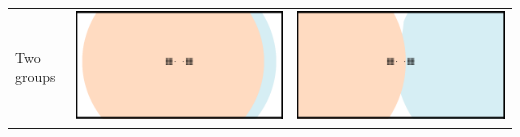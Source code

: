 \documentclass[8pt, handout=show,notes=show]{beamer}
\begin{document}
\begin{frame}
\begin{table}[h]
\begin{tabular}{lcc}
Two groups&\includegraphics[width=\imgSize]{../images/5StaticEnv/environments/staticEnv3}&\includegraphics[width=\imgSize]{../images/5StaticEnv/environments/staticEnv4}\\
\end{tabular}
\label{tab:gt}

\end{table}%

\end{frame}
\end{document}
